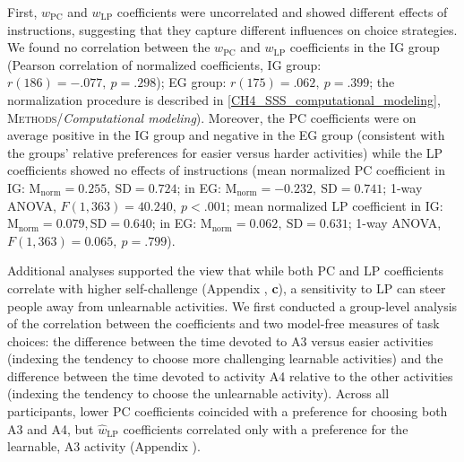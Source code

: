 First, $w_{\mathrm{PC}}$ and $w_{\mathrm{LP}}$ coefficients were uncorrelated and showed different effects of instructions, suggesting that they capture different influences on choice strategies. We found no correlation between the $w_{\mathrm{PC}}$ and $w_{\mathrm{LP}}$ coefficients in the \ac{IG} group (Pearson correlation of normalized coefficients, \ac{IG} group: $r(186) = -.077,\ p = .298$); \ac{EG} group: $r(175) = .062,\ p = .399$; the normalization procedure is described in \cref{CH4_SSS_computational_modeling}, \textsc{Methods}/\textit{Computational modeling}). Moreover, the \ac{PC} coefficients were on average positive in the \ac{IG} group and negative in the \ac{EG} group (consistent with the groups' relative preferences for easier versus harder activities) while the \ac{LP} coefficients showed no effects of instructions (mean normalized \ac{PC} coefficient in \ac{IG}: $\text{M}_{\text{norm}} = 0.255,\ \text{SD} = 0.724$; in \ac{EG}: $\text{M}_{\text{norm}} = -0.232,\ \text{SD} = 0.741$; 1-way ANOVA, $F(1, 363) = 40.240,\ p < .001$; mean normalized \ac{LP} coefficient in \ac{IG}: $\text{M}_{\text{norm}} = 0.079, \text{SD} = 0.640$; in \ac{EG}: $\text{M}_{\text{norm}} = 0.062,\ \text{SD} = 0.631$; 1-way ANOVA, $F(1, 363) = 0.065,\ p = .799$).

Additional analyses supported the view that while both \ac{PC} and \ac{LP} coefficients correlate with higher self-challenge (Appendix , \textbf{c}), a sensitivity to \ac{LP} can steer people away from unlearnable activities. We first conducted a group-level analysis of the correlation between the coefficients and two model-free measures of task choices: the difference between the time devoted to A3 versus easier activities (indexing the tendency to choose more challenging learnable activities) and the difference between the time devoted to activity A4 relative to the other activities (indexing the tendency to choose the unlearnable activity). Across all participants, lower \ac{PC} coefficients coincided with a preference for choosing both A3 and A4, but $\hat w_{\mathrm{LP}}$ coefficients correlated only with a preference for the learnable, A3 activity (Appendix ).

